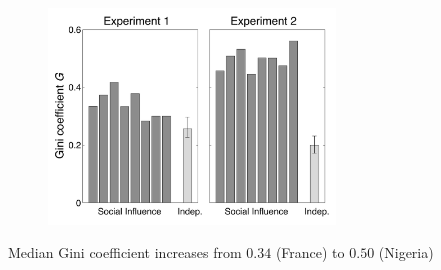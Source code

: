 \documentclass[aspectratio=169]{beamer}
\begin{document}
\begin{frame}

\begin{figure}
  \centering
  \includegraphics[width=3in]{figures/compare_gini_v1v2_unordered_ci}
\end{figure}

Median Gini coefficient increases from $0.34$ (France) to $0.50$ (Nigeria)
\end{frame}
\end{document}
